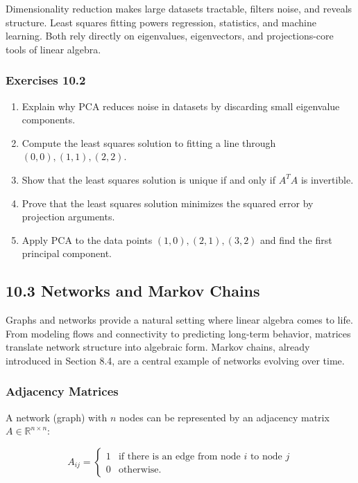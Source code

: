 \documentclass[
  12pt,
  a4paper,
]{article}
\begin{document}
Dimensionality reduction makes large datasets tractable, filters noise,
and reveals structure. Least squares fitting powers regression,
statistics, and machine learning. Both rely directly on eigenvalues,
eigenvectors, and projections-core tools of linear algebra.

\subsubsection{Exercises 10.2}\label{exercises-102}

\begin{enumerate}
\def\labelenumi{\arabic{enumi}.}
\item
  Explain why PCA reduces noise in datasets by discarding small
  eigenvalue components.
\item
  Compute the least squares solution to fitting a line through
  \((0,0), (1,1), (2,2)\).
\item
  Show that the least squares solution is unique if and only if
  \(A^T A\) is invertible.
\item
  Prove that the least squares solution minimizes the squared error by
  projection arguments.
\item
  Apply PCA to the data points \((1,0), (2,1), (3,2)\) and find the
  first principal component.
\end{enumerate}

\subsection{10.3 Networks and Markov
Chains}\label{103-networks-and-markov-chains}

Graphs and networks provide a natural setting where linear algebra comes
to life. From modeling flows and connectivity to predicting long-term
behavior, matrices translate network structure into algebraic form.
Markov chains, already introduced in Section 8.4, are a central example
of networks evolving over time.

\subsubsection{Adjacency Matrices}\label{adjacency-matrices}

A network (graph) with \(n\) nodes can be represented by an adjacency
matrix \(A \in \mathbb{R}^{n \times n}\):

\[A_{ij} =
\begin{cases}
1 & \text{if there is an edge from node \(i\) to node \(j\)} \\
0 & \text{otherwise.}
\end{cases}\]
\end{document}
